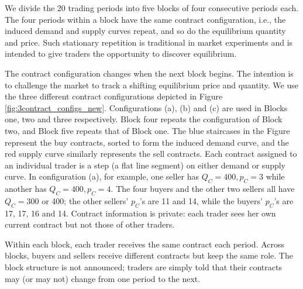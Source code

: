 \documentclass[12pt]{article}
\begin{document}
We divide the 20 trading periods into five blocks of four consecutive periods each. 
The four periods within a block have the same contract configuration, i.e., the induced demand and supply curves repeat, and so do the equilibrium quantity and price. 
Such stationary repetition is traditional in market experiments and is intended to give traders the opportunity to discover equilibrium.

The contract configuration changes when the next block begins. 
The intention is to challenge the market to track a shifting equilibrium price and quantity.
We use the three different contract configurations depicted in Figure \ref{fig:3contract_configs_new}.
Configurations (a), (b) and (c) are used in Blocks one, two and three respectively.
Block four repeats the configuration of Block two, and Block five repeats that of Block one. 
The blue staircases in the Figure represent the buy contracts, sorted to form the induced demand curve, and the red supply curve similarly represents the sell contracts. 
Each contract assigned to an individual trader is a step (a flat line segment) on either demand or supply curve. 
In configuration (a), 
for example, one seller has $Q_{C}=400, p_{C}=3$ while another has $Q_{C}=400, p_{C}=4.$ 
The four buyers and the other two sellers all have 
$Q_{C}=300$ or 400; the other sellers' $p_C$'s are 11 and 14,
while the buyers' $p_C$'s are 17, 17, 16 and 14.
Contract information is private: each trader sees her own current contract but not those of other traders.

Within each block, each trader receives the same contract each period. Across blocks, buyers and sellers receive different contracts but keep the same role. The block structure is not announced; traders are simply told that their contracts may (or may not) change from one period to the next. 


\end{document}
